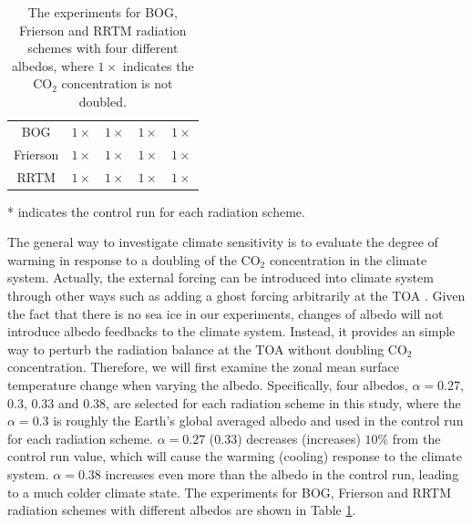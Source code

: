 \begin{table}[ht]
	\centering
	\caption{The experiments for BOG, Frierson and RRTM radiation schemes with four different albedos, where $1\times$ indicates the CO$_2$ concentration is not doubled.} %
	\vspace{0.5em}
	\renewcommand{\arraystretch}{1.5}
	\begin{threeparttable}
	\begin{tabular}{c|*{4}{c}}
		\toprule
		\diagbox{Scheme}{Albedo} &\makebox[3em]{0.38}&\makebox[3em]{0.33}&\makebox[3em]{0.3\tnote{*}}
		&\makebox[3em]{0.27}\\
	    \midrule
		BOG &  $1\times$ & $1\times$ & $1\times$& $1\times$ \\
		Frierson & $1\times$ & $1\times$ & $1\times$ & $1\times$ \\ 
		RRTM & $1\times$ & $1\times$ & $1\times$ & $1\times$ \\
		\bottomrule
	\end{tabular}%
	\begin{tablenotes}
      \item[*] indicates the control run for each radiation scheme.
     \end{tablenotes}
	\end{threeparttable}
	\label{tab:exp_table}
\end{table}

The general way to investigate climate sensitivity is to evaluate the degree of warming in response to a doubling of the CO$_2$ concentration in the climate system. Actually, the external forcing can be introduced into climate system through other ways such as adding a ghost forcing  arbitrarily at the TOA \citep{Hansen1997,Alexeev2005}. Given the fact that there is no sea ice in our experiments, changes of albedo will not introduce albedo feedbacks to the climate system. Instead, it provides an simple way to perturb the radiation balance at the TOA without doubling CO$_2$ concentration. Therefore, we will first examine the zonal mean surface temperature change when varying the albedo. Specifically, four albedos, $\alpha=$0.27, 0.3, 0.33 and 0.38, are selected for each radiation scheme in this study, where the $\alpha = 0.3$ is roughly the Earth's global averaged albedo and used in the control run for each radiation scheme. $\alpha=0.27$ (0.33) decreases (increases) $10\%$ from the control run value, which will cause the warming (cooling) response to the climate system. $\alpha=0.38$ increases even more than the albedo in the control run, leading to a much colder climate state. The experiments for BOG, Frierson and RRTM radiation schemes with different albedos are shown in Table \ref{tab:exp_table}.

